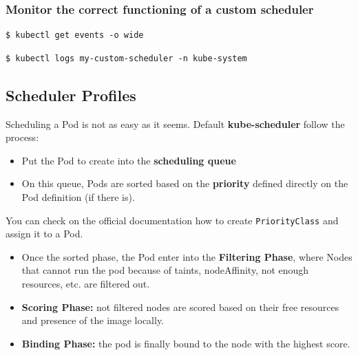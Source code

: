 \documentclass{article}
\newenvironment{blocktemplateI}[1]{%
    \tcolorbox[beamer,%
    noparskip,breakable,
    colframe=Violet,%
    colbacklower=Black,%
    title=#1]}%
    {\endtcolorbox}
\newenvironment{codetemplate}[1][]{%
  \mybasecolorbox[#1]
  \itshape
}{%
  \endmybasecolorbox
}
\begin{document}
\subsubsection{Monitor the correct functioning of a custom scheduler}

\begin{codetemplate}{}
\begin{verbatim}
$ kubectl get events -o wide
\end{verbatim}
\end{codetemplate}

\begin{codetemplate}{}
\begin{verbatim}
$ kubectl logs my-custom-scheduler -n kube-system
\end{verbatim}
\end{codetemplate}

\subsection{Scheduler Profiles}

Scheduling a Pod is not as easy as it seems. Default \textbf{kube-scheduler} follow the process:
\begin{itemize}
    \item Put the Pod to create into the \textbf{scheduling queue}
    \item On this queue, Pods are sorted based on the \textbf{priority} defined directly on the Pod definition (if there is).
\end{itemize}

\begin{blocktemplateI}{NOTE}
You can check on the official documentation how to create \verb|PriorityClass| and assign it to a Pod.
\end{blocktemplateI}

\begin{itemize}
    \item Once the sorted phase, the Pod enter into the \textbf{Filtering Phase}, where Nodes that cannot run the pod because of taints, nodeAffinity, not enough resources, etc. are filtered out.
    \item \textbf{Scoring Phase:} not filtered nodes are scored based on their free resources and presence of the image locally.
    \item \textbf{Binding Phase:} the pod is finally bound to the node with the highest score.
\end{itemize}
\end{document}
